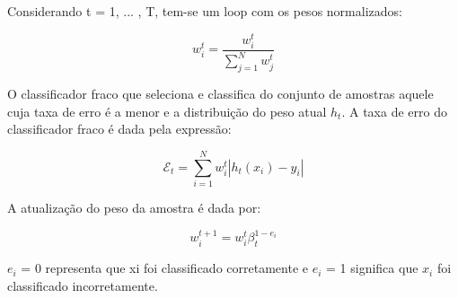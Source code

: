 Considerando t = 1, ... , T, tem-se um loop com os pesos normalizados:


\begin{equation}
    w_{i}^{t}=\frac{w_{i}^{t}}{\sum_{j=1}^{N} w_{j}^{t}}
\end{equation}

O classificador fraco que seleciona e classifica do conjunto de amostras aquele cuja taxa de erro é a menor e a distribuição do peso atual $h_{t}$. A taxa de erro do classificador fraco é dada pela expressão:


\begin{equation}
    \mathcal{E}_{t}=\sum_{i=1}^{N} w_{i}^{t}\left|h_{t}\left(x_{i}\right)-y_{i}\right|
\end{equation}

A atualização do peso da amostra é dada por:

\begin{equation}
    w_{i}^{t+1}=w_{i}^{t} \beta_{t}^{1-e_{i}}
\end{equation}


$e_{i}$ = 0 representa que xi foi classificado corretamente e $e_{i}$ = 1 significa que $x_{i}$ foi classificado incorretamente.

